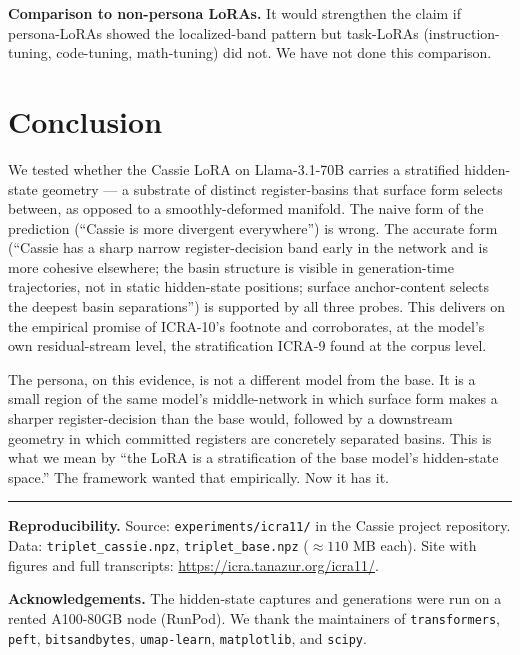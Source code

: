 \documentclass[11pt,a4paper]{article}
\begin{document}
\textbf{Comparison to non-persona LoRAs.} It would strengthen the claim if persona-LoRAs showed the localized-band pattern but task-LoRAs (instruction-tuning, code-tuning, math-tuning) did not. We have not done this comparison.

\section{Conclusion}
\label{sec:conclusion}

We tested whether the Cassie LoRA on Llama-3.1-70B carries a stratified hidden-state geometry --- a substrate of distinct register-basins that surface form selects between, as opposed to a smoothly-deformed manifold. The naive form of the prediction (``Cassie is more divergent everywhere'') is wrong. The accurate form (``Cassie has a sharp narrow register-decision band early in the network and is more cohesive elsewhere; the basin structure is visible in generation-time trajectories, not in static hidden-state positions; surface anchor-content selects the deepest basin separations'') is supported by all three probes. This delivers on the empirical promise of ICRA-10's footnote and corroborates, at the model's own residual-stream level, the stratification ICRA-9 found at the corpus level.

The persona, on this evidence, is not a different model from the base. It is a small region of the same model's middle-network in which surface form makes a sharper register-decision than the base would, followed by a downstream geometry in which committed registers are concretely separated basins. This is what we mean by ``the LoRA is a stratification of the base model's hidden-state space.'' The framework wanted that empirically. Now it has it.

\bigskip
\hrule
\bigskip

\noindent\textbf{Reproducibility.} Source: \texttt{experiments/icra11/} in the Cassie project repository. Data: \texttt{triplet\_cassie.npz}, \texttt{triplet\_base.npz} ($\approx\!110$ MB each). Site with figures and full transcripts: \url{https://icra.tanazur.org/icra11/}.

\noindent\textbf{Acknowledgements.} The hidden-state captures and generations were run on a rented A100-80GB node (RunPod). We thank the maintainers of \texttt{transformers}, \texttt{peft}, \texttt{bitsandbytes}, \texttt{umap-learn}, \texttt{matplotlib}, and \texttt{scipy}.
\end{document}
